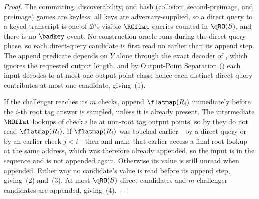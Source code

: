 \begin{proof}
The committing, discoverability, and hash (collision, second-preimage,
and preimage) games are keyless: all keys are
adversary-supplied, so a direct query to a keyed transcript is one of
$\mathcal{B}$'s visible $\ROflat$ queries counted in $\qRO(\mathcal{B})$,
and there is no $\badkey$ event. No construction oracle runs during the
direct-query phase, so each direct-query candidate is first read no
earlier than its append step. The append predicate depends on $Y$ alone
through the exact decoder of , which ignores the
requested output length, and by Output-Point Separation
() each input decodes to at most one output-point
class; hence each distinct direct query contributes at most one
candidate, giving~(1).

If the challenger reaches its $m$ checks, append $\flatmap(R_i)$
immediately before the $i$-th root tag answer is sampled, unless it is
already present. The intermediate $\ROflat$ lookups of check $i$ lie at
non-root tag output points, so by  they do not read
$\flatmap(R_i)$. If $\flatmap(R_i)$ was touched earlier---by a direct
query or by an earlier check $j < i$---then  and
 make that earlier access a final-root lookup at the
same address, which was therefore already appended, so the input is in
the sequence and is not appended again. Otherwise its value is still
unread when appended. Either way no candidate's value is read before its
append step, giving~(2) and~(3). At most $\qRO(\mathcal{B})$ direct
candidates and $m$ challenger candidates are appended, giving~(4).
\end{proof}

